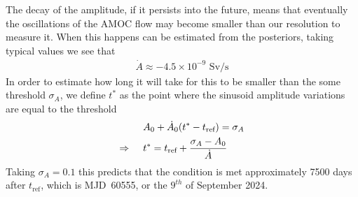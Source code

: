 \documentclass{article}
\newcommand{\tref}{t_{\textrm{ref}}}
\begin{document}
The decay of the amplitude, if it persists into the future, means that eventually
the oscillations of the AMOC flow may become smaller than our resolution to
measure it. When this happens can be estimated from the posteriors, taking
typical values we see that
\begin{align}
\dot{A} \approx -4.5\times10^{-9}\textrm{ Sv/s}
\end{align}
In order to estimate how long it will take for this to be smaller than the
some threshold $\sigma_A$, we define $t^{*}$ as the point where the sinusoid amplitude
variations are equal to the threshold
\begin{align}
 & A_0 + \dot{A}_0(t^{*} - \tref) = \sigma_A  \\
\Rightarrow \hspace{5mm}  & t^{*}   = \tref + \frac{\sigma_A - A_0}{\dot{A}}
\end{align}
Taking $\sigma_A = 0.1$ this predicts that the condition is met approximately
7500 days after $\tref$, which is MJD~60555, or the $9^{th}$ of September 2024.
\end{document}
